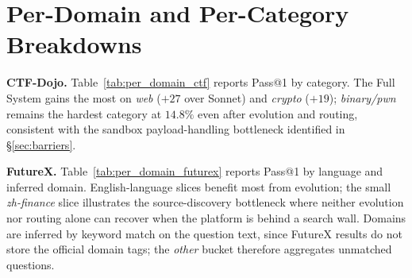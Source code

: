 \documentclass[11pt]{article}
\theoremstyle{plain}
\begin{document}
\section{Per-Domain and Per-Category Breakdowns}
\label{app:per_domain}

\noindent\textbf{CTF-Dojo.}
Table~\ref{tab:per_domain_ctf} reports Pass@1 by category. The Full System gains the most on \emph{web} ($+27$ over Sonnet) and \emph{crypto} ($+19$); \emph{binary/pwn} remains the hardest category at $14.8\%$ even after evolution and routing, consistent with the sandbox payload-handling bottleneck identified in \S\ref{sec:barriers}.


\begin{table}[t]
\centering\footnotesize
\setlength{\tabcolsep}{3pt}
\caption{Per-category Pass@1 (\%) on CTF-Dojo. Categories are parsed from the \texttt{detail} field; \emph{binary/pwn} merges the conventionally-equivalent CTF tags. Bold marks the best system per row.}
\label{tab:per_domain_ctf}
\end{table}


\noindent\textbf{FutureX.}
Table~\ref{tab:per_domain_futurex} reports Pass@1 by language and inferred domain. English-language slices benefit most from evolution; the small \emph{zh-finance} slice illustrates the source-discovery bottleneck where neither evolution nor routing alone can recover when the platform is behind a search wall. Domains are inferred by keyword match on the question text, since FutureX results do not store the official domain tags; the \textit{other} bucket therefore aggregates unmatched questions.
\end{document}
